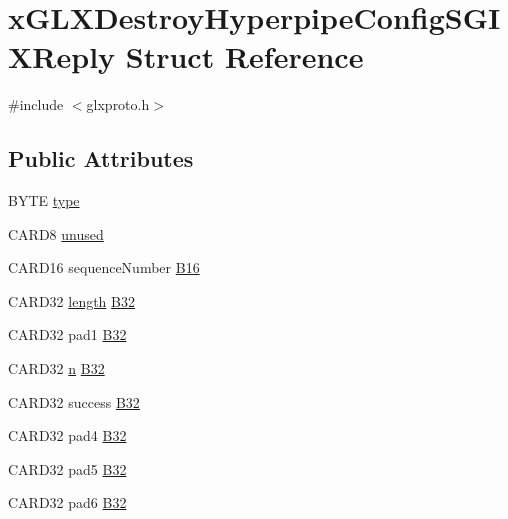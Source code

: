 \hypertarget{structx_g_l_x_destroy_hyperpipe_config_s_g_i_x_reply}{}\section{x\+G\+L\+X\+Destroy\+Hyperpipe\+Config\+S\+G\+I\+X\+Reply Struct Reference}
\label{structx_g_l_x_destroy_hyperpipe_config_s_g_i_x_reply}


{\ttfamily \#include $<$glxproto.\+h$>$}

\subsection*{Public Attributes}
\begin{DoxyCompactItemize}
\item 
B\+Y\+TE \hyperlink{structx_g_l_x_destroy_hyperpipe_config_s_g_i_x_reply_a2f279356cb79c6f0c43b47918634fa9d}{type}
\item 
C\+A\+R\+D8 \hyperlink{structx_g_l_x_destroy_hyperpipe_config_s_g_i_x_reply_a240e8c2747f84ca39d31cc1713afd5dc}{unused}
\item 
C\+A\+R\+D16 sequence\+Number \hyperlink{structx_g_l_x_destroy_hyperpipe_config_s_g_i_x_reply_a77e21e2300e283c39469d7fdfe9c18ae}{B16}
\item 
C\+A\+R\+D32 \hyperlink{glcorearb_8h_ab9c919755bde3b34349e23a32b4e0fa7}{length} \hyperlink{structx_g_l_x_destroy_hyperpipe_config_s_g_i_x_reply_a1cd2102cc732beaf2304896361fda9d7}{B32}
\item 
C\+A\+R\+D32 pad1 \hyperlink{structx_g_l_x_destroy_hyperpipe_config_s_g_i_x_reply_a63e5457a884b8ea4c992ced431478c06}{B32}
\item 
C\+A\+R\+D32 \hyperlink{glcorearb_8h_ae2b4646468bc89d0ba646f5cf838e051}{n} \hyperlink{structx_g_l_x_destroy_hyperpipe_config_s_g_i_x_reply_aa797c2e5617c9d1e39fe82cd744cc3ab}{B32}
\item 
C\+A\+R\+D32 success \hyperlink{structx_g_l_x_destroy_hyperpipe_config_s_g_i_x_reply_ad39706790f0d9154bd45f8bb34ac28a2}{B32}
\item 
C\+A\+R\+D32 pad4 \hyperlink{structx_g_l_x_destroy_hyperpipe_config_s_g_i_x_reply_a4a32e0c46454fe39a7db4dc431d8cc32}{B32}
\item 
C\+A\+R\+D32 pad5 \hyperlink{structx_g_l_x_destroy_hyperpipe_config_s_g_i_x_reply_a6dbe8fffc3a51ab367c8cb4c28463cc7}{B32}
\item 
C\+A\+R\+D32 pad6 \hyperlink{structx_g_l_x_destroy_hyperpipe_config_s_g_i_x_reply_accf609c257b554e6c36b4be8c16b95bc}{B32}
\end{DoxyCompactItemize}


